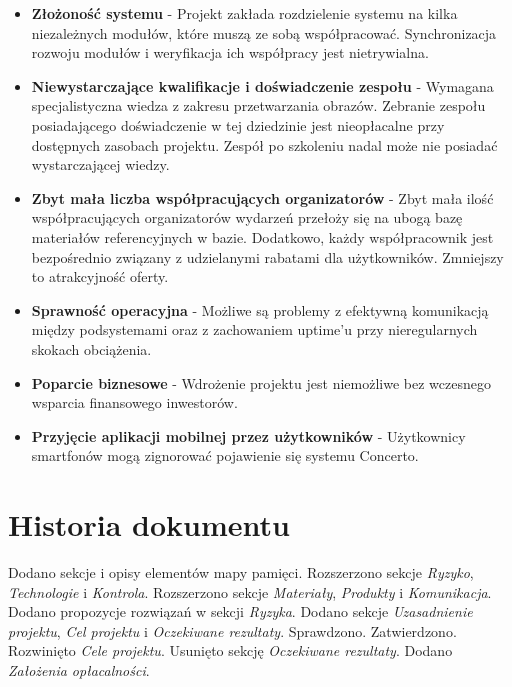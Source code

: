 \documentclass[10pt]{dokument-ppi}
\begin{document}
\begin{itemize}
  \item \textbf{Złożoność systemu} - Projekt zakłada rozdzielenie systemu na kilka niezależnych modułów, które muszą ze sobą współpracować. Synchronizacja rozwoju modułów i weryfikacja ich współpracy jest nietrywialna. 

  \item \textbf{Niewystarczające kwalifikacje i doświadczenie zespołu} -  Wymagana specjalistyczna wiedza z zakresu przetwarzania obrazów. Zebranie zespołu posiadającego doświadczenie w tej dziedzinie jest nieopłacalne przy dostępnych zasobach projektu. Zespół po szkoleniu nadal może nie posiadać wystarczającej wiedzy. 

  \item \textbf{Zbyt mała liczba współpracujących organizatorów} - Zbyt mała ilość współpracujących organizatorów wydarzeń przełoży się na ubogą bazę materiałów referencyjnych w bazie. Dodatkowo, każdy współpracownik jest bezpośrednio związany z udzielanymi rabatami dla użytkowników. Zmniejszy to atrakcyjność oferty.

  \item \textbf{Sprawność operacyjna} - Możliwe są problemy z efektywną komunikacją między podsystemami oraz z zachowaniem uptime'u przy nieregularnych skokach obciążenia.

  \item \textbf{Poparcie biznesowe} - Wdrożenie projektu jest niemożliwe bez wczesnego wsparcia finansowego inwestorów.

  \item \textbf{Przyjęcie aplikacji mobilnej przez użytkowników} - Użytkownicy smartfonów mogą zignorować pojawienie się systemu Concerto.
\end{itemize}

\newpage
\section*{Historia dokumentu}
\begin{versions}
        Dodano sekcje i opisy elementów mapy pamięci.
        Rozszerzono sekcje \emph{Ryzyko}, \emph{Technologie} i \emph{Kontrola}.
        Rozszerzono sekcje \emph{Materiały}, \emph{Produkty} i \emph{Komunikacja}.
        Dodano propozycje rozwiązań w sekcji \emph{Ryzyka}.
        Dodano sekcje \emph{Uzasadnienie projektu}, \emph{Cel projektu} i
        \emph{Oczekiwane rezultaty}.
        Sprawdzono.
        Zatwierdzono.
        Rozwinięto \emph{Cele projektu}. Usunięto sekcję \emph{Oczekiwane
        rezultaty}. Dodano \emph{Założenia opłacalności}.
\end{versions}
\end{document}
